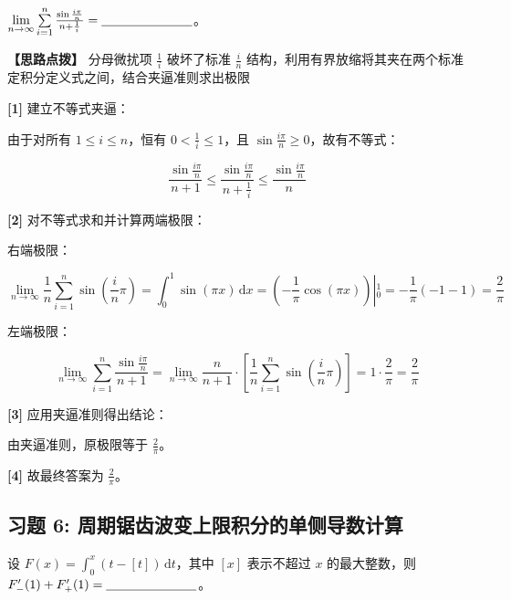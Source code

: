 \documentclass[11pt,a4paper,UTF8]{ctexart}
\begin{document}
$\lim\limits_{n \to \infty} \sum\limits_{i=1}^n \frac{\sin \frac{i\pi}{n}}{n + \frac{1}{i}} = \underline{\hspace{2.5cm}}$。

\textbf{\color{DeepPurple}【思路点拨】} 分母微扰项 $\frac{1}{i}$ 破坏了标准 $\frac{i}{n}$ 结构，利用有界放缩将其夹在两个标准定积分定义式之间，结合夹逼准则求出极限


\begin{solbox}[分步推导与答题规范]
\textbf{[1]} 建立不等式夹逼：

由于对所有 $1 \leqslant i \leqslant n$，恒有 $0 < \frac{1}{i} \leqslant 1$，且 $\sin\frac{i\pi}{n} \geqslant 0$，故有不等式：


\begin{equation*}
\frac{\sin \frac{i\pi}{n}}{n+1} \leqslant \frac{\sin \frac{i\pi}{n}}{n + \frac{1}{i}} \leqslant \frac{\sin \frac{i\pi}{n}}{n}
\end{equation*}


\textbf{[2]} 对不等式求和并计算两端极限：

右端极限：


\begin{equation*}
\lim_{n \to \infty} \frac{1}{n}\sum_{i=1}^n \sin\left(\frac{i}{n}\pi\right) = \int_0^1 \sin(\pi x)\,\mathrm{d}x = \left. \left( -\frac{1}{\pi}\cos(\pi x) \right) \right\vert{}_0^1 = -\frac{1}{\pi}(-1 - 1) = \frac{2}{\pi}
\end{equation*}


左端极限：


\begin{equation*}
\lim_{n \to \infty} \sum_{i=1}^n \frac{\sin \frac{i\pi}{n}}{n+1} = \lim_{n \to \infty} \frac{n}{n+1} \cdot \left[ \frac{1}{n}\sum_{i=1}^n \sin\left(\frac{i}{n}\pi\right) \right] = 1 \cdot \frac{2}{\pi} = \frac{2}{\pi}
\end{equation*}


\textbf{[3]} 应用夹逼准则得出结论：

由夹逼准则，原极限等于 $\frac{2}{\pi}$。

\textbf{[4]} 故最终答案为 $\frac{2}{\pi}$。
\end{solbox}


\subsection{习题 6: 周期锯齿波变上限积分的单侧导数计算}

设 $F(x) = \int_0^x (t - [t])\,\mathrm{d}t$，其中 $[x]$ 表示不超过 $x$ 的最大整数，则 $F'_-(1) + F'_+(1) = \underline{\hspace{2.5cm}}$。
\end{document}

